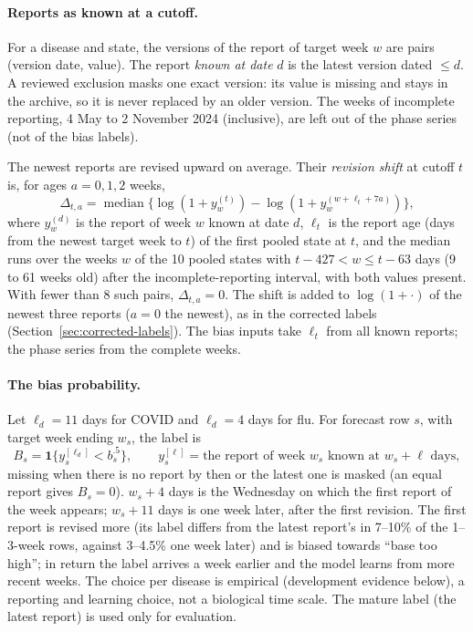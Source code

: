 \documentclass[11pt,a4paper]{article}
\newcommand{\ind}{\mathbf{1}}
\theoremstyle{definition}
\theoremstyle{remark}
\begin{document}
\paragraph{Reports as known at a cutoff.}
For a disease and state, the versions of the report of target week $w$ are
pairs (version date, value). The report \emph{known at date} $d$ is the
latest version dated $\le d$. A reviewed exclusion masks one exact
version: its value is missing and stays in the archive, so it is never
replaced by an older version. The weeks of incomplete reporting, 4 May to
2 November 2024 (inclusive), are left out of the phase series (not of the
bias labels).

The newest reports are revised upward on average. Their \emph{revision
shift} at cutoff $t$ is, for ages $a=0,1,2$ weeks,
\[
 \Delta_{t,a}=\operatorname{median}\bigl\{\log(1+y_w^{(t)})-
 \log(1+y_w^{(w+\ell_t+7a)})\bigr\},
\]
where $y_w^{(d)}$ is the report of week $w$ known at date $d$, $\ell_t$ is the
report age (days from the newest target week to $t$) of the first pooled  
state at $t$, and the median runs over the weeks $w$ of the 10 pooled
states with $t-427<w\le t-63$ days (9 to 61 weeks old) after the
incomplete-reporting interval, with both values present. With fewer than 8
such pairs, $\Delta_{t,a}=0$. The shift is added to $\log(1+\cdot)$ of the
newest three reports ($a=0$ the newest), as in the corrected labels
(Section~\ref{sec:corrected-labels}). The bias inputs take $\ell_t$ from all
known reports; the phase series from the complete weeks.

\paragraph{The bias probability.}
\label{sec:bias-probability-model}
Let $\ell_d=11$ days for COVID and $\ell_d=4$ days for flu. For forecast row
$s$, with target week ending $w_s$, the label is
\[
 B_s=\ind\bigl\{y_s^{[\ell_d]}<b_s^{.5}\bigr\},\qquad
 y_s^{[\ell]}=\text{the report of week $w_s$ known at $w_s+\ell$ days},
\]
missing when there is no report by then or the latest one is masked
(an equal report gives $B_s=0$). $w_s+4$ days is the Wednesday on which the
first report of the week appears; $w_s+11$ days is one week later, after the
first revision. The first report is revised more (its label differs from
the latest report's in 7--10\% of the 1--3-week rows, against 3--4.5\% one
week later) and is biased towards ``base too high''; in return the label
arrives a week earlier and the model learns from more recent weeks. The
choice per disease is empirical (development evidence below), a reporting
and learning choice, not a biological time scale. The mature label (the
latest report) is used only for evaluation.
\end{document}
